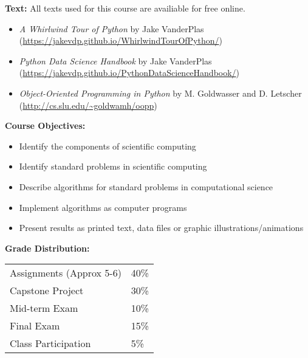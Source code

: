 \documentclass[11pt]{article}
\begin{document}
\textbf {\large Text:} All texts used for this course are availiable for free online.\\
\begin{itemize}
    \item \textit{A Whirlwind Tour of Python} by Jake VanderPlas \\
(\url{https://jakevdp.github.io/WhirlwindTourOfPython/})\\
    \item \textit{Python Data Science Handbook} by Jake VanderPlas \\
(\url{https://jakevdp.github.io/PythonDataScienceHandbook/})\\
    \item \textit{Object-Oriented Programming in Python} by M. Goldwasser and D. Letscher \\
(\url{http://cs.slu.edu/~goldwamh/oopp}) \\
\end{itemize}

\textbf {\large Course Objectives:} 
\begin{itemize} \itemsep-0.4em
\item Identify the components of scientific computing
\item Identify standard problems in scientific computing
\item Describe algorithms for standard problems in computational science
\item Implement algorithms as computer programs
\item Present results as printed text, data files or graphic illustrations/animations
\end{itemize}


\textbf {\large Grade Distribution:} \\
\hspace*{40mm}
\begin{tabular}{ l l }
Assignments (Approx 5-6)& 40\% \\
Capstone Project & 30\% \\
Mid-term Exam & 10\% \\
Final Exam & 15\% \\
Class Participation &5\%
\end{tabular} \\\\
\end{document}
